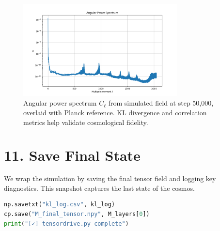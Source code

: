 \begin{figure}[H]
    \centering
    \includegraphics[width=0.75\textwidth]{images/cl_spectrum_001500.png}
    \caption{Angular power spectrum \( C_\ell \) from simulated field at step 50,000, overlaid with Planck reference. KL divergence and correlation metrics help validate cosmological fidelity.}
    \label{fig:cl_final}
\end{figure}
    

\section*{11. Save Final State}
We wrap the simulation by saving the final tensor field and logging key diagnostics. This snapshot captures the last state of the cosmos.
\begin{lstlisting}[language=Python]
np.savetxt("kl_log.csv", kl_log)
cp.save("M_final_tensor.npy", M_layers[0])
print("[✓] tensordrive.py complete")
\end{lstlisting}
